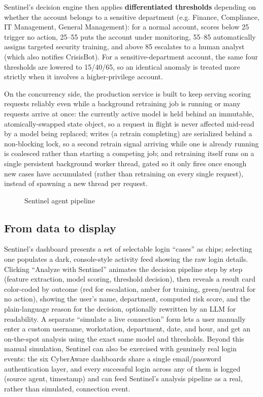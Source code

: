 \documentclass[12pt,a4paper]{report}
\newcommand{\ProjectName}{CyberAware}
\begin{document}
Sentinel's decision engine then applies \textbf{differentiated thresholds} depending on whether the account belongs to a sensitive department (e.g. Finance, Compliance, IT Management, General Management): for a normal account, scores below 25 trigger no action, 25--55 puts the account under monitoring, 55--85 automatically assigns targeted security training, and above 85 escalates to a human analyst (which also notifies CrisisBot). For a sensitive-department account, the same four thresholds are lowered to 15/40/65, so an identical anomaly is treated more strictly when it involves a higher-privilege account.

On the concurrency side, the production service is built to keep serving scoring requests reliably even while a background retraining job is running or many requests arrive at once: the currently active model is held behind an immutable, atomically-swapped state object, so a request in flight is never affected mid-read by a model being replaced; writes (a retrain completing) are serialized behind a non-blocking lock, so a second retrain signal arriving while one is already running is coalesced rather than starting a competing job; and retraining itself runs on a single persistent background worker thread, gated so it only fires once enough new cases have accumulated (rather than retraining on every single request), instead of spawning a new thread per request.

\begin{figure}[htbp]
\centering

\caption{Sentinel agent pipeline}
\label{fig:sentinel-pipeline}
\end{figure}

\subsection*{From data to display}
Sentinel's dashboard presents a set of selectable login ``cases'' as chips; selecting one populates a dark, console-style activity feed showing the raw login details. Clicking ``Analyze with Sentinel'' animates the decision pipeline step by step (feature extraction, model scoring, threshold decision), then reveals a result card color-coded by outcome (red for escalation, amber for training, green/neutral for no action), showing the user's name, department, computed risk score, and the plain-language reason for the decision, optionally rewritten by an LLM for readability. A separate ``simulate a live connection'' form lets a user manually enter a custom username, workstation, department, date, and hour, and get an on-the-spot analysis using the exact same model and thresholds. Beyond this manual simulation, Sentinel can also be exercised with genuinely real login events: the six \ProjectName{} dashboards share a single email/password authentication layer, and every successful login across any of them is logged (source agent, timestamp) and can feed Sentinel's analysis pipeline as a real, rather than simulated, connection event.
\end{document}

